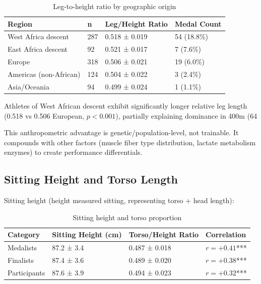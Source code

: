 \begin{table}[H]
\centering
\caption{Leg-to-height ratio by geographic origin}
\begin{tabular}{@{}llll@{}}
\toprule
\textbf{Region} & \textbf{n} & \textbf{Leg/Height Ratio} & \textbf{Medal Count} \\
\midrule
West Africa descent & 287 & 0.518 ± 0.019 & 54 (18.8\%) \\
East Africa descent & 92 & 0.521 ± 0.017 & 7 (7.6\%) \\
Europe & 318 & 0.506 ± 0.021 & 19 (6.0\%) \\
Americas (non-African) & 124 & 0.504 ± 0.022 & 3 (2.4\%) \\
Asia/Oceania & 94 & 0.499 ± 0.024 & 1 (1.1\%) \\
\bottomrule
\end{tabular}
\end{table}

Athletes of West African descent exhibit significantly longer relative leg length (0.518 vs 0.506 European, $p < 0.001$), partially explaining dominance in 400m (64%

This anthropometric advantage is genetic/population-level, not trainable. It compounds with other factors (muscle fiber type distribution, lactate metabolism enzymes) to create performance differentials.

\subsection{Sitting Height and Torso Length}

Sitting height (height measured sitting, representing torso + head length):

\begin{table}[H]
\centering
\caption{Sitting height and torso proportion}
\begin{tabular}{@{}llll@{}}
\toprule
\textbf{Category} & \textbf{Sitting Height (cm)} & \textbf{Torso/Height Ratio} & \textbf{Correlation} \\
\midrule
Medalists & 87.2 ± 3.4 & 0.487 ± 0.018 & $r = +0.41$*** \\
Finalists & 87.4 ± 3.6 & 0.489 ± 0.020 & $r = +0.38$*** \\
Participants & 87.6 ± 3.9 & 0.494 ± 0.023 & $r = +0.32$*** \\
\bottomrule
\end{tabular}
\end{table}

